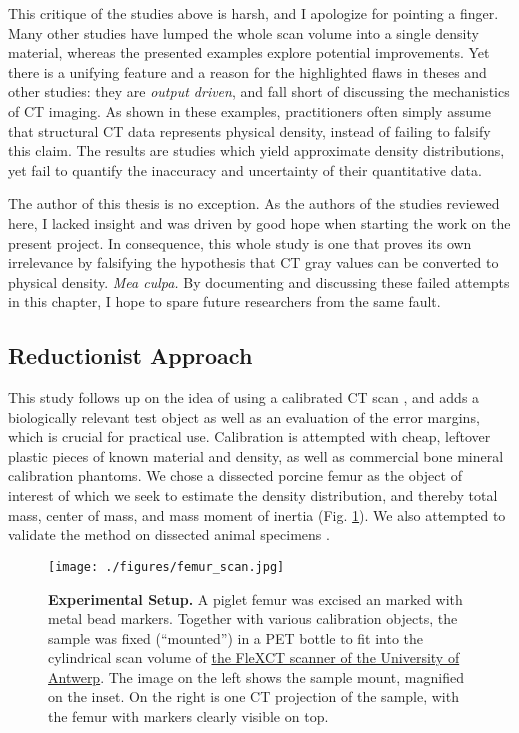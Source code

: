 This critique of the studies above is harsh, and I apologize for pointing a finger.
Many other studies have lumped the whole scan volume into a single density material, whereas the presented examples explore potential improvements.
Yet there is a unifying feature and a reason for the highlighted flaws in theses and other studies: they are \emph{output driven}, and fall short of discussing the mechanistics of CT imaging.
As shown in these examples, practitioners often simply assume that structural CT data represents physical density, instead of failing to falsify this claim.
The results are studies which yield approximate density distributions, yet fail to quantify the inaccuracy and uncertainty of their quantitative data.


The author of this thesis is no exception.
As the authors of the studies reviewed here, I lacked insight and was driven by good hope when starting the work on the present project.
In consequence, this whole study is one that proves its own irrelevance by falsifying the hypothesis that CT gray values can be converted to physical density.
\emph{Mea culpa.}
By documenting and discussing these failed attempts in this chapter, I hope to spare future researchers from the same fault.


\subsection{Reductionist Approach}
\label{sec:org1c12ebd}
This study follows up on the idea of using a calibrated CT scan \citep{DuPlessis2013}, and adds a biologically relevant test object as well as an evaluation of the error margins, which is crucial for practical use.
Calibration is attempted with cheap, leftover plastic pieces of known material and density, as well as commercial bone mineral calibration phantoms.
We chose a dissected porcine femur as the object of interest of which we seek to estimate the density distribution, and thereby total mass, center of mass, and mass moment of inertia (Fig. \ref{fig:femur_scan}).
We also attempted to validate the method on dissected animal specimens \citep[as][]{Durston2022}.

\begin{figure}[htbp]
\centering
\texttt{[image: ./figures/femur\_scan.jpg]}
\caption{\label{fig:femur_scan}\textbf{Experimental Setup.} A piglet femur was excised an marked with metal bead markers. Together with various calibration objects, the sample was fixed (``mounted'') in a PET bottle to fit into the cylindrical scan volume of \href{https://www.uantwerpen.be/en/research-groups/vision-lab/x-ray-imaging-resear/flexct}{the FleXCT scanner of the University of Antwerp}. The image on the left shows the sample mount, magnified on the inset. On the right is one CT projection of the sample, with the femur with markers clearly visible on top.}
\end{figure}


